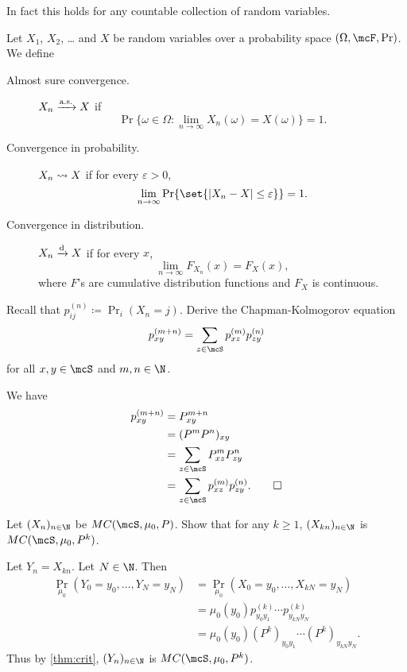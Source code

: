 In fact this holds for any countable collection of random variables.

\begin{definition*}
    Let $X_1$, $X_2$, \ldots{} and $X$ be random variables over a probability
    space $(\Omega, \F, \Pr)$.
    We define
    \begin{description}
        \item[Almost sure convergence.] $X_n \xrightarrow{\text{a.s.}} X$ if \[
            \Pr\{\omega \in \Omega : \lim_{n \to \infty} X_n(\omega)
                = X(\omega)\} = 1.
        \]
        \item[Convergence in probability.] $X_n \leadsto X$ if for every
        $\varepsilon > 0$, \[
            \lim_{n \to \infty} \Pr \set{\abs{X_n - X} \le \varepsilon} = 1.
        \]
        \item[Convergence in distribution.] $X_n \xrightarrow{\text{d}} X$ if for every $x$,
        \[
            \lim_{n \to \infty} F_{X_n}(x) = F_X(x),
        \] where $F$'s are cumulative distribution functions and $F_X$ is
        continuous.
    \end{description}
\end{definition*}

\begin{exercise*} \label{thm:chapman_kolmogorov}
    Recall that $p_{ij}^{(n)} \coloneq \Pr_i(X_n = j)$.
    Derive the Chapman-Kolmogorov equation \[
        p_{xy}^{(m+n)} = \sum_{z \in \mcS} p_{xz}^{(m)} p_{zy}^{(n)}
    \] for all $x, y \in \mcS$ and $m, n \in \N$.
\end{exercise*}
\begin{solution}
    We have \begin{align*}
        p_{xy}^{(m+n)} &= P^{m+n}_{xy} \\
            &= (P^m P^n)_{xy} \\
            &= \sum_{z \in \mcS} P^m_{xz} P^n_{zy} \\
            &= \sum_{z \in \mcS} p_{xz}^{(m)} p_{zy}^{(n)}. \qedhere
    \end{align*}
\end{solution}

\begin{exercise}
    Let $(X_n)_{n \in \N}$ be $MC(\mcS, \mu_0, P)$.
    Show that for any $k \ge 1$, $(X_{kn})_{n \in \N}$ is
    $MC(\mcS, \mu_0, P^k)$.
\end{exercise}
\begin{solution}
    Let $Y_n = X_{kn}$.
    Let $N \in \N$.
    Then \begin{align*}
        \Pr_{\mu_0}(Y_0 = y_0, \dots, Y_N = y_N)
            &= \Pr_{\mu_0}(X_0 = y_0, \dots, X_{kN} = y_N) \\
            &= \mu_0(y_0) p_{y_0 y_1}^{(k)} \cdots p_{y_{kN} y_N}^{(k)} \\
            &= \mu_0(y_0) (P^k)_{y_0 y_1} \cdots (P^k)_{y_{kN} y_N}.
    \end{align*}
    Thus by \cref{thm:crit}, $(Y_n)_{n \in \N}$ is $MC(\mcS, \mu_0, P^k)$.
\end{solution}

